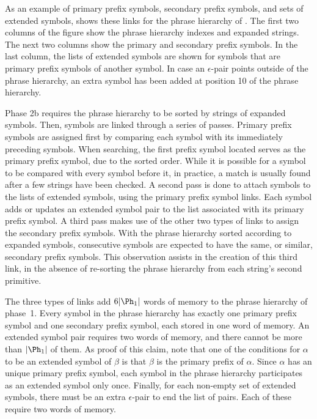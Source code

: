 As an example of primary prefix symbols, secondary prefix symbols,
and sets of extended symbols, 
shows these links for the phrase hierarchy of
.  The first two columns of
the figure show the phrase hierarchy indexes and expanded strings.  
The next two columns show the primary and secondary
prefix symbols.  In the last column, the lists of
extended symbols are shown for symbols that are primary
prefix symbols of another symbol.
In case an $\epsilon$-pair points outside
of the phrase hierarchy, an extra symbol has been added at
position 10 of the phrase hierarchy.



Phase 2b requires the phrase hierarchy to be sorted by
strings of expanded symbols.  Then, symbols are linked
through a series of passes.  Primary prefix symbols are assigned
first by comparing each symbol with its immediately preceding
symbols.  When searching, the first prefix symbol located 
serves as the primary prefix symbol, due to the sorted order.  While
it is possible for a symbol to be compared with every symbol
before it, in practice, a match is usually found after a few 
strings have been checked.  
A second pass is done to attach
symbols to the lists of extended symbols, using the
primary prefix symbol links.  Each symbol adds or updates an
extended symbol pair to the list associated with its
primary prefix symbol.  A third pass makes use of the other two
types of links to assign the secondary prefix symbols.
With the phrase hierarchy
sorted according to expanded symbols, consecutive symbols are
expected to have the same, or similar, secondary prefix symbols.
This observation assists in the creation of this third link,
in the absence of re-sorting the phrase hierarchy from each
string's second primitive.

The three types of links add $6|\Ph_1|$
words of memory to the phrase hierarchy of phase~1.  
Every symbol in the phrase hierarchy has exactly one primary
prefix symbol and one secondary prefix symbol, each stored in
one word of memory.  An extended symbol pair requires two
words of memory, and there cannot be more than 
$|\Ph_1|$ of them.  As proof of this claim, note
that one of the conditions for $\alpha$ to be an extended
symbol of $\beta$ is that $\beta$ is the primary prefix of 
$\alpha$.  Since $\alpha$ has an unique primary prefix symbol,
each symbol in the phrase hierarchy participates as 
an extended symbol only once.
Finally, for each non-empty set
of extended symbols, there must be an extra $\epsilon$-pair
to end the list of pairs.
Each of these require two words of memory.  

